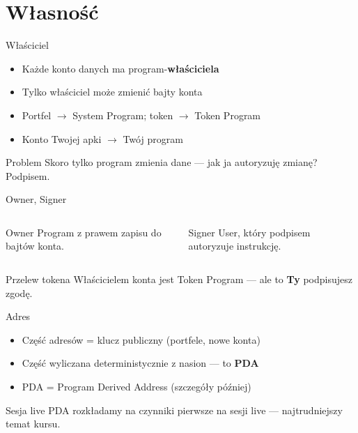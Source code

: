 \section{Własność}

\begin{frame}{Właściciel}
  \begin{itemize}
    \item Każde konto danych ma program-\textbf{właściciela}
    \item Tylko właściciel może zmienić bajty konta
    \item Portfel $\to$ System Program; token $\to$ Token Program
    \item Konto Twojej apki $\to$ Twój program
  \end{itemize}
  \vspace{0.2cm}
  \begin{alertblock}{Problem}
    Skoro tylko program zmienia dane --- jak ja autoryzuję zmianę? Podpisem.
  \end{alertblock}
\end{frame}

\begin{frame}{Owner, Signer}
  \begin{columns}
      \begin{block}{Owner}
        Program z prawem zapisu do bajtów konta.
      \end{block}
      \begin{block}{Signer}
        User, który podpisem autoryzuje instrukcję.
      \end{block}
  \end{columns}
  \vspace{0.3cm}
  \begin{exampleblock}{Przelew tokena}
    Właścicielem konta jest Token Program --- ale to \textbf{Ty} podpisujesz zgodę.
  \end{exampleblock}
\end{frame}

\begin{frame}{Adres}
  \begin{itemize}
    \item Część adresów = klucz publiczny (portfele, nowe konta)
    \item Część wyliczana deterministycznie z nasion --- to \textbf{PDA}
    \item PDA = Program Derived Address (szczegóły później)
  \end{itemize}
  \vspace{0.25cm}
  \begin{alertblock}{Sesja live}
    PDA rozkładamy na czynniki pierwsze na sesji live --- najtrudniejszy temat kursu.
  \end{alertblock}
\end{frame}

